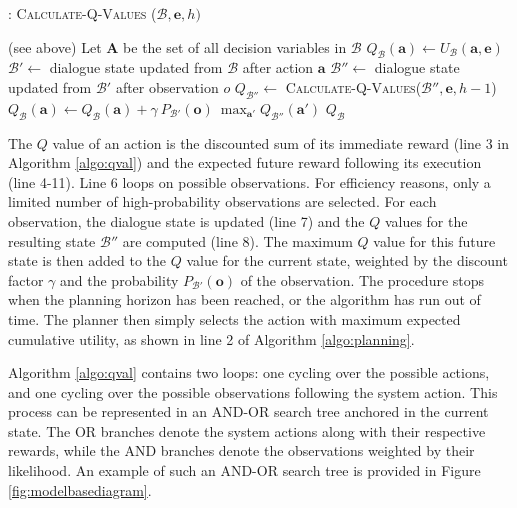 \begin{algorithm}[h!]
\caption{: \textsc{Calculate-Q-Values} ($\mathcal{B}, \mathbf{e}, h)$}
\begin{algorithmic}[1] \vspace{1mm}
\REQUIRE (see above)
\STATE Let $\mathbf{A}$ be the set of all decision variables in $\mathcal{B}$
\STATE $Q_{\mathcal{B}}(\mathbf{a}) \leftarrow U_{\mathcal{B}}(\mathbf{a}, \mathbf{e})$
\STATE $\mathcal{B}' \leftarrow $ dialogue state updated from $\mathcal{B}$ after action $\mathbf{a}$
\STATE $\mathcal{B}'' \leftarrow $ dialogue state updated from $\mathcal{B}'$ after observation $o$
\STATE $Q_{\mathcal{B}''} \leftarrow $ \textsc{Calculate-Q-Values}($\mathcal{B}'', \mathbf{e}, h -1$)
\STATE $Q_{\mathcal{B}}(\mathbf{a}) \leftarrow Q_{\mathcal{B}}(\mathbf{a}) + \gamma \ P_{\mathcal{B}'}(\mathbf{o}) \ \max_{\mathbf{a}'} Q_{\mathcal{B}''}(\mathbf{a}')$
\ENDFOR
\ENDIF
\ENDFOR
\RETURN $Q_{\mathcal{B}}$
\end{algorithmic} 
\label{algo:qval}
\end{algorithm}

The $Q$ value of an action is the discounted sum of its immediate reward (line 3 in Algorithm \ref{algo:qval}) and the expected future reward following its execution (line 4-11).  Line 6 loops on possible observations.  For efficiency reasons, only a limited number of high-probability observations are selected. For each observation, the dialogue state is updated (line 7) and the $Q$ values for the resulting state $\mathcal{B}''$ are computed (line 8).  The maximum $Q$ value for this future state is then added to the $Q$ value for the current state, weighted by the discount factor $\gamma$ and the probability $P_{\mathcal{B}'} (\mathbf{o})$ of the observation.  The procedure stops when the planning horizon has been reached, or the algorithm has run out of time. The planner then simply selects the action with maximum expected cumulative utility, as shown in line 2 of Algorithm \ref{algo:planning}. 

Algorithm \ref{algo:qval} contains two loops: one cycling over the possible actions, and one cycling over the possible observations following the system action. This process can be represented in an AND-OR search tree anchored in the current state. The OR branches denote the system actions along with their respective rewards, while the AND branches denote the observations weighted by their likelihood. An example of such an AND-OR search tree is provided in Figure \ref{fig:modelbasediagram}.

